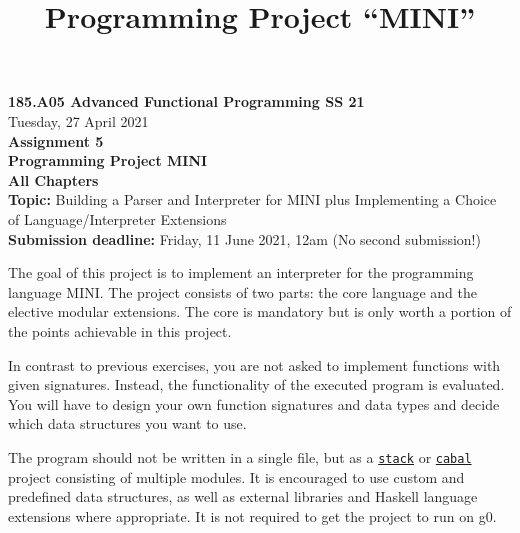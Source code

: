 \documentclass{article}
\title{Programming Project ``MINI''}
\begin{document}
\large
\thispagestyle{empty}
\begin{center}
  {\Large \textbf{185.A05 Advanced Functional Programming SS 21}}  \\ [1ex] 
               Tuesday, 27 April 2021 \\ [1ex] 
               {\Large \textbf{Assignment 5}} \\[.5ex]
              {\Large \textbf{Programming Project MINI}} \\[.5ex]
                 \textbf{All Chapters}  \\ [.75ex]
           \textbf{Topic:} Building a Parser and Interpreter for MINI plus Implementing a Choice of Language/Interpreter Extensions \\[1ex]
          \textbf{Submission deadline:}  Friday, 11 June 2021, 12am  (No second submission!) \\ [.5ex]
\end{center}

\vspace{1ex}
\noindent
\noindent





\newcommand{\code}[1]{\texttt{#1}}

\noindent
The goal of this project is to implement an interpreter for the programming language MINI. The project consists of two parts: the core language and the elective modular extensions. The core is mandatory but is only worth a portion of the points achievable in this project.

In contrast to previous exercises, you are not asked to implement functions with given signatures. Instead, the functionality of the executed program is evaluated. You will have to design your own function signatures and data types and decide which data structures you want to use.

The program should not be written in a single file, but as a \href{https://docs.haskellstack.org/en/stable/README/}{\code{stack}} or \href{https://cabal.readthedocs.io/en/3.4/}{\code{cabal}} project consisting of multiple modules. It is encouraged to use custom and predefined data structures, as well as external libraries and Haskell language extensions where appropriate. It is not required to get the project to run on g0.
\end{document}
